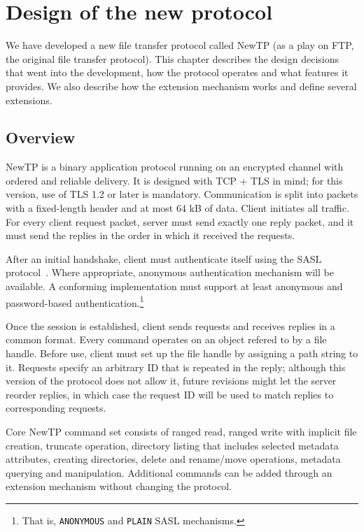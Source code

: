 
\chapter{Design of the new protocol}

We have developed a new file transfer protocol called NewTP (as a play on FTP, the original file transfer
protocol). This chapter describes the design decisions that went into the development, how the protocol
operates and what features it provides. We also describe how the extension mechanism works and define several
extensions.


\section{Overview}

NewTP is a binary application protocol running on an encrypted channel with ordered and reliable delivery. It
is designed with TCP + TLS in mind; for this version, use of TLS 1.2 or later is mandatory. Communication is
split into packets with a fixed-length header and at most 64 kB of data. Client initiates all traffic. For
every client request packet, server must send exactly one reply packet, and it must send the replies in the
order in which it received the requests.

After an initial handshake, client must authenticate itself using the SASL protocol~\cite{rfc4422}. Where
appropriate, anonymous authentication mechanism will be available. A conforming implementation must support at
least anonymous and password-based authentication.\footnote{That is, {\tt ANONYMOUS} and {\tt PLAIN} SASL
mechanisms.}

Once the session is established, client sends requests and receives replies in a common format. Every command
operates on an object refered to by a file handle. Before use, client must set up the file handle by assigning
a path string to it. Requests specify an arbitrary ID that is repeated in the reply; although this version of
the protocol does not allow it, future revisions might let the server reorder replies, in which case the
request ID will be used to match replies to corresponding requests.

Core NewTP command set consists of ranged read, ranged write with implicit file creation, truncate operation,
directory listing that includes selected metadata attributes, creating directories, delete and rename/move
operations, metadata querying and manipulation. Additional commands can be added through an extension
mechanism without changing the protocol.


